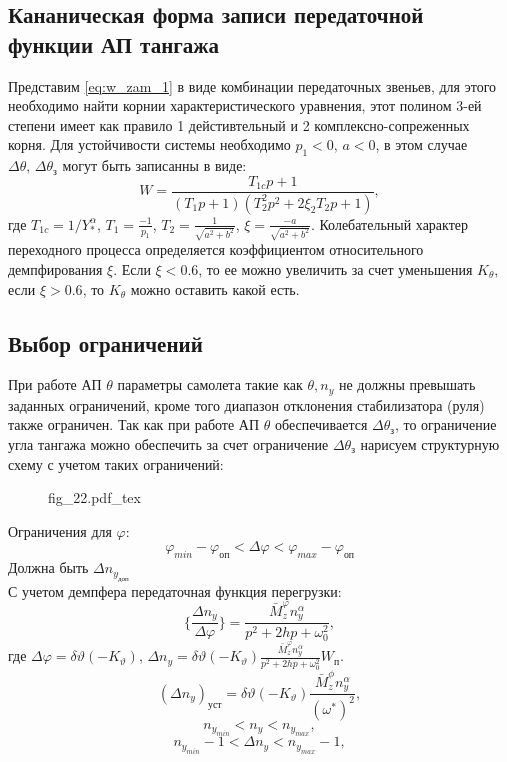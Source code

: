 \documentclass{article}
\begin{document}
\subsection{Кананическая форма записи передаточной функции АП тангажа}
Представим \ref{eq:w_zam_1} в виде комбинации передаточных звеньев, для этого необходимо найти корнии характеристического уравнения, этот полином 3-ей степени имеет как правило 1 дейстивтельный и 2 комплексно-сопреженных корня. Для устойчивости системы необходимо $p_1 < 0, \, a<0$, в этом случае $\Delta \theta, \, \Delta \theta_\text{з}$ могут быть записанны в виде:
\[
	W = \frac{T_{1c} p + 1}{(T_{1}p + 1)(T_2^2 p^2 + 2 \xi_2 T_2 p + 1)}, 
\]
где $T_{1c} = 1/Y_*^\alpha$, $T_1 = \frac{-1}{p_1}$, $T_2 = \frac{1}{\sqrt{a^2 + b^2}}$, $\xi = \frac{-a}{\sqrt{a^2 + b^2}}$.
Колебательный характер переходного процесса определяется коэффициентом относительного демпфирования $\xi$. Если $\xi < 0.6$, то ее можно увеличить за счет уменьшения $K_\theta$, если $\xi > 0.6$, то $K_\theta$ можно оставить какой есть.
\subsection{Выбор ограничений}
При работе АП $\theta$ параметры самолета такие как $\theta, n_y$ не должны превышать заданных ограничений, кроме того диапазон отклонения стабилизатора (руля) также ограничен. Так как при работе АП $\theta$ обеспечивается $\Delta \theta_\text{з}$, то ограничение угла тангажа можно обеспечить за счет ограничение $\Delta \theta_\text{з}$ нарисуем структурную схему с учетом таких ограничений:

\begin{figure}[H]
	\centering
	{fig_22.pdf_tex}
\end{figure}

Ограничения для $\varphi$:
\[ \varphi_{min} - \varphi_\text{оп} < \Delta \varphi < \varphi_{max} - \varphi_\text{оп}\]
Должна быть $\Delta n_{y_\text{доп}}$\\
С учетом демпфера передаточная функция перегрузки: 
\[
	\{\frac{\Delta n_y}{\Delta \varphi}\} = \frac{\bar{M}_z^\varphi n_y^\alpha}{p^2 + 2hp + \omega_0^2},
\]
где $\Delta \varphi = \delta \vartheta (-K_\vartheta)$, $\Delta n_y = \delta \vartheta (-K_\vartheta ) \frac{\bar{M}_z^\varphi n_y^\alpha}{p^2 + 2hp + \omega_0^2}W_\text{п}$.
\[
	(\Delta n_y)_\text{уст} = \delta \vartheta (- K_\vartheta)\frac{\bar{M}_z^\phi n_y^\alpha}{(\omega^*)^2},
\]
\[
	n_{{y}_{min}} < n_y < n_{{y}_{max}},
\]
\[
	n_{{y}_{min}} - 1< \Delta n_y < n_{{y}_{max}} - 1,
\]
\end{document}
